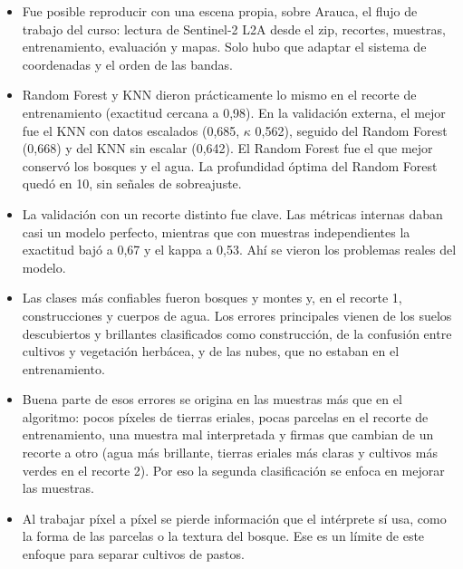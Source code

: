 \documentclass[11pt,letterpaper]{article}
\begin{document}
\begin{itemize}
    \item Fue posible reproducir con una escena propia, sobre Arauca, el flujo de trabajo del curso:
    lectura de Sentinel-2 L2A desde el zip, recortes, muestras, entrenamiento, evaluación y mapas. Solo hubo
    que adaptar el sistema de coordenadas y el orden de las bandas.
    \item Random Forest y KNN dieron prácticamente lo mismo en el recorte de entrenamiento (exactitud cercana
    a 0,98). En la validación externa, el mejor fue el KNN con datos escalados (0,685, $\kappa$ 0,562), seguido
    del Random Forest (0,668) y del KNN sin escalar (0,642). El Random Forest fue el que mejor conservó los
    bosques y el agua. La profundidad óptima del Random Forest quedó en 10, sin señales de sobreajuste.
    \item La validación con un recorte distinto fue clave. Las métricas internas daban casi un modelo
    perfecto, mientras que con muestras independientes la exactitud bajó a 0,67 y el kappa a 0,53. Ahí se
    vieron los problemas reales del modelo.
    \item Las clases más confiables fueron bosques y montes y, en el recorte 1, construcciones y cuerpos de
    agua. Los errores principales vienen de los suelos descubiertos y brillantes clasificados como
    construcción, de la confusión entre cultivos y vegetación herbácea, y de las nubes, que no estaban en
    el entrenamiento.
    \item Buena parte de esos errores se origina en las muestras más que en el algoritmo: pocos píxeles de
    tierras eriales, pocas parcelas en el recorte de entrenamiento, una muestra mal interpretada y firmas que
    cambian de un recorte a otro (agua más brillante, tierras eriales más claras y cultivos más verdes en el
    recorte 2). Por eso la segunda clasificación se enfoca en mejorar las muestras.
    \item Al trabajar píxel a píxel se pierde información que el intérprete sí usa, como la forma de las
    parcelas o la textura del bosque. Ese es un límite de este enfoque para separar cultivos de pastos.
\end{itemize}
\end{document}
